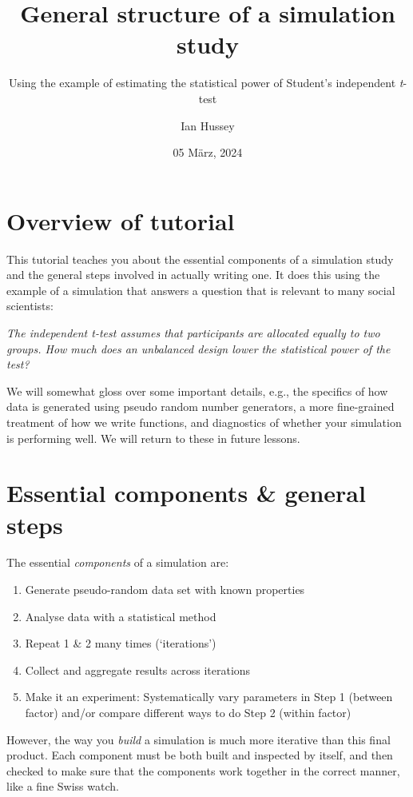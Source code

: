 \documentclass[
]{article}
\title{General structure of a simulation study}
\subtitle{Using the example of estimating the statistical power of
Student's independent \emph{t}-test}
\author{Ian Hussey}
\date{05 März, 2024}
\providecommand{\tightlist}{%
  \setlength{\itemsep}{0pt}\setlength{\parskip}{0pt}}
\begin{document}
\maketitle

{
\setcounter{tocdepth}{2}
\tableofcontents
}
\hypertarget{overview-of-tutorial}{%
\section{Overview of tutorial}\label{overview-of-tutorial}}

This tutorial teaches you about the essential components of a simulation
study and the general steps involved in actually writing one. It does
this using the example of a simulation that answers a question that is
relevant to many social scientists:

\emph{The independent t-test assumes that participants are allocated
equally to two groups. How much does an unbalanced design lower the
statistical power of the test?}

We will somewhat gloss over some important details, e.g., the specifics
of how data is generated using pseudo random number generators, a more
fine-grained treatment of how we write functions, and diagnostics of
whether your simulation is performing well. We will return to these in
future lessons.

\hypertarget{essential-components-general-steps}{%
\section{Essential components \& general
steps}\label{essential-components-general-steps}}

The essential \emph{components} of a simulation are:

\begin{enumerate}
\def\labelenumi{\arabic{enumi}.}
\tightlist
\item
  Generate pseudo-random data set with known properties
\item
  Analyse data with a statistical method
\item
  Repeat 1 \& 2 many times (`iterations')
\item
  Collect and aggregate results across iterations
\item
  Make it an experiment: Systematically vary parameters in Step 1
  (between factor) and/or compare different ways to do Step 2 (within
  factor)
\end{enumerate}

However, the way you \emph{build} a simulation is much more iterative
than this final product. Each component must be both built and inspected
by itself, and then checked to make sure that the components work
together in the correct manner, like a fine Swiss watch.
\end{document}
